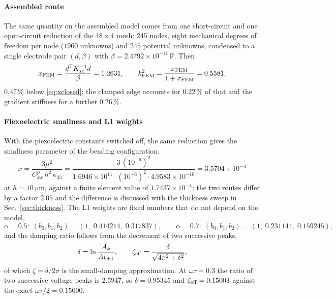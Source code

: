 \paragraph{Assembled route} The same quantity on the assembled model comes from
one short-circuit and one open-circuit reduction of the $48\times4$ mesh:
$245$ nodes, eight mechanical degrees of freedom per node ($1960$ unknowns)
and $245$ potential unknowns, condensed to a single electrode pair $(d,\beta)$
with $\beta=2.4792\times10^{-11}$\,\si{\farad}. Then
\begin{equation}
  x_{\rm FEM}=\frac{d^{\mathsf T}K_{sc}^{-1}d}{\beta}=1.2631,
  \qquad
  k^{2}_{\rm FEM}=\frac{x_{\rm FEM}}{1+x_{\rm FEM}}=0.5581 ,
  \label{eq:xFEM}
\end{equation}
$0.47\,\%$ below \eqref{eq:xclosed}; the clamped edge accounts for $0.22\,\%$
of that and the gradient stiffness for a further $0.26\,\%$.

\paragraph{Flexoelectric smallness and L1 weights} With the piezoelectric
constants switched off, the same reduction gives the smallness parameter of the
bending configuration,
\begin{equation}
  x=\frac{3\mu^{2}}{C^{p}_{xx}\,h^{2}\,\kappa_{33}}
   =\frac{3\,(10^{-6})^{2}}{1.6946\times10^{11}\cdot(10^{-6})^{2}\cdot
     4.9583\times10^{-10}}
   =3.5704\times10^{-4}
  \label{eq:xflexo}
\end{equation}
at $h=\SI{10}{\micro\metre}$, against a finite element value of
$1.7437\times10^{-4}$; the two routes differ by a factor $2.05$ and the
difference is discussed with the thickness sweep in Sec.~\ref{sec:thickness}.
The L1 weights are fixed numbers that do not depend on the model,
\begin{equation}
  \alpha=0.5:\; (b_0,b_1,b_2)=(1,\;0.414214,\;0.317837),\qquad
  \alpha=0.7:\; (b_0,b_1,b_2)=(1,\;0.231144,\;0.159245),
  \label{eq:bweights}
\end{equation}
and the damping ratio follows from the decrement of two successive peaks,
\begin{equation}
  \delta=\ln\frac{A_k}{A_{k+1}},\qquad
  \zeta_{\rm eff}=\frac{\delta}{\sqrt{4\pi^{2}+\delta^{2}}} ,
  \label{eq:zeta}
\end{equation}
of which $\zeta=\delta/2\pi$ is the small-damping approximation. At
$\omega\tau=0.3$ the ratio of two successive voltage peaks is $2.5947$, so
$\delta=0.95345$ and $\zeta_{\rm eff}=0.15003$ against the exact
$\omega\tau/2=0.15000$.

